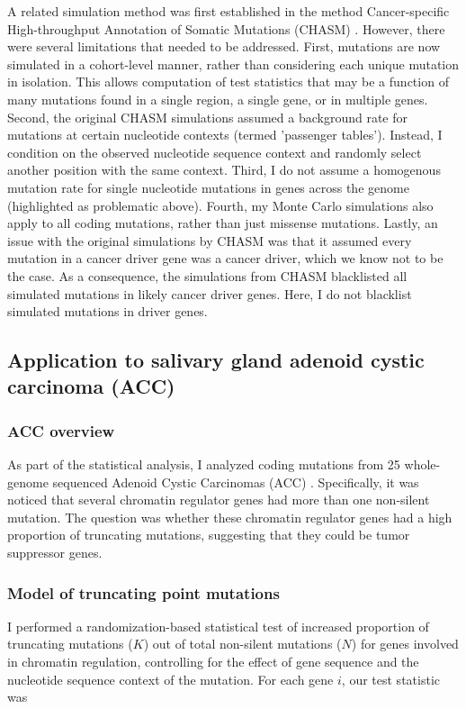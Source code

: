 A related simulation method was first established in the method Cancer-specific High-throughput Annotation of Somatic Mutations (CHASM) \cite{RN29}. However, there were several limitations that needed to be addressed. First, mutations are now simulated in a cohort-level manner, rather than considering each unique mutation in isolation. This allows computation of test statistics that may be a function of many mutations found in a single region, a single gene, or in multiple genes. Second, the original CHASM simulations assumed a background rate for mutations at certain nucleotide contexts (termed 'passenger tables'). Instead, I condition on the observed nucleotide sequence context and randomly select another position with the same context. Third, I do not assume a homogenous mutation rate for single nucleotide mutations in genes across the genome (highlighted as problematic above). Fourth, my Monte Carlo simulations also apply to all coding mutations, rather than just missense mutations. Lastly, an issue with the original simulations by CHASM was that it assumed every mutation in a cancer driver gene was a cancer driver, which we know not to be the case. As a consequence, the simulations from CHASM blacklisted all simulated mutations in likely cancer driver genes. Here, I do not blacklist simulated mutations in driver genes.

\subsection{Application to salivary gland adenoid cystic carcinoma (ACC)}

\subsubsection{ACC overview}

As part of the statistical analysis, I analyzed coding mutations from 25 whole-genome sequenced Adenoid Cystic Carcinomas (ACC) \cite{RN76}. Specifically, it was noticed that several chromatin regulator genes had more than one non-silent mutation. The question was whether these chromatin regulator genes had a high proportion of truncating mutations, suggesting that they could be tumor suppressor genes.

\subsubsection{Model of truncating point mutations}

I performed a randomization-based statistical test of increased proportion of truncating mutations ($K$) out of total non-silent mutations ($N$) for genes involved in chromatin regulation, controlling for the effect of gene sequence and the nucleotide sequence context of the mutation. For each gene $i$, our test statistic was


